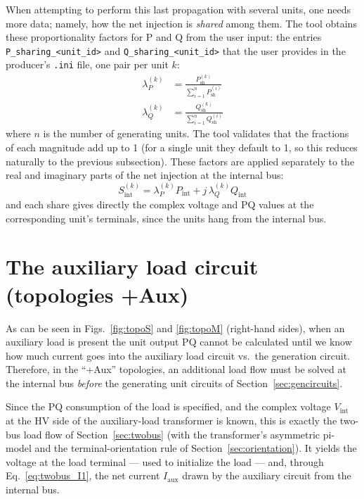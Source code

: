 \documentclass[a4paper,11pt]{article}
\newcommand{\code}[1]{\texttt{#1}}  %
\begin{document}
When attempting to perform this last propagation with several units, one needs more
data; namely, how the net injection is \emph{shared} among them. The tool obtains these
proportionality factors for P and Q from the user input: the entries
\code{P\_sharing\_<unit\_id>} and \code{Q\_sharing\_<unit\_id>} that the user provides
in the producer's \code{.ini} file, one pair per unit $k$:
\begin{equation}
  \begin{split}
    \lambda_P^{(k)} & = \frac{P_{\textrm{sh}}^{(k)}}{\sum_{i=1}^n P_{\textrm{sh}}^{(i)}} \\
    \lambda_Q^{(k)} & = \frac{Q_{\textrm{sh}}^{(k)}}{\sum_{i=1}^n Q_{\textrm{sh}}^{(i)}}
  \end{split}
  \label{eq:sharing}
\end{equation}
where $n$ is the number of generating units. The tool validates that the fractions of
each magnitude add up to 1 (for a single unit they default to 1, so this reduces
naturally to the previous subsection). These factors are applied separately to the real
and imaginary parts of the net injection at the internal bus:
\begin{equation*}
  S_{\textrm{int}}^{(k)} = \lambda_P^{(k)} P_{\textrm{int}} +
                         j \, \lambda_Q^{(k)} Q_{\textrm{int}}
\end{equation*}
and each share gives directly the complex voltage and PQ values at the corresponding
unit's terminals, since the units hang from the internal bus.




\section{The auxiliary load circuit (topologies +Aux)}
\label{sec:auxcircuits}

As can be seen in Figs.~\ref{fig:topoS} and \ref{fig:topoM} (right-hand sides), when an
auxiliary load is present the unit output PQ cannot be calculated until we know how much
current goes into the auxiliary load circuit vs.\ the generation circuit. Therefore, in
the ``+Aux'' topologies, an additional load flow must be solved at the internal bus
\emph{before} the generating unit circuits of Section~\ref{sec:gencircuits}.

Since the PQ consumption of the load is specified, and the complex voltage
$V_{\textrm{int}}$ at the HV side of the auxiliary-load transformer is known, this is
exactly the two-bus load flow of Section~\ref{sec:twobus} (with the transformer's
asymmetric pi-model and the terminal-orientation rule of
Section~\ref{sec:orientation}). It yields the voltage at the load terminal --- used to
initialize the load --- and, through Eq.~\eqref{eq:twobus_I1}, the net current
$I_{\textrm{aux}}$ drawn by the auxiliary circuit from the internal bus.
\end{document}
